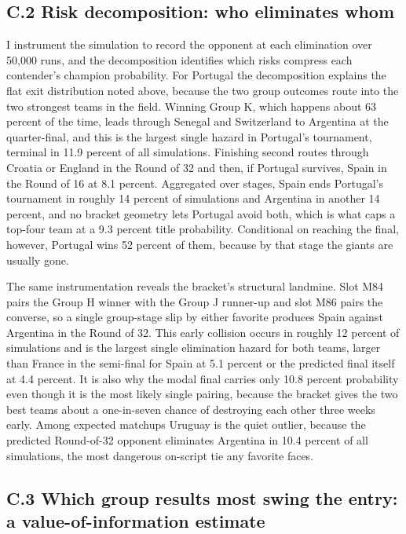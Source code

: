 \documentclass[11pt,letterpaper]{article}
\begin{document}
\subsection*{C.2 \quad Risk decomposition: who eliminates whom}

I instrument the simulation to record the opponent at each elimination over 50{,}000 runs, and the decomposition identifies which risks compress each contender's champion probability. For Portugal the decomposition explains the flat exit distribution noted above, because the two group outcomes route into the two strongest teams in the field. Winning Group K, which happens about 63 percent of the time, leads through Senegal and Switzerland to Argentina at the quarter-final, and this is the largest single hazard in Portugal's tournament, terminal in 11.9 percent of all simulations. Finishing second routes through Croatia or England in the Round of 32 and then, if Portugal survives, Spain in the Round of 16 at 8.1 percent. Aggregated over stages, Spain ends Portugal's tournament in roughly 14 percent of simulations and Argentina in another 14 percent, and no bracket geometry lets Portugal avoid both, which is what caps a top-four team at a 9.3 percent title probability. Conditional on reaching the final, however, Portugal wins 52 percent of them, because by that stage the giants are usually gone.

The same instrumentation reveals the bracket's structural landmine. Slot M84 pairs the Group H winner with the Group J runner-up and slot M86 pairs the converse, so a single group-stage slip by either favorite produces Spain against Argentina in the Round of 32. This early collision occurs in roughly 12 percent of simulations and is the largest single elimination hazard for both teams, larger than France in the semi-final for Spain at 5.1 percent or the predicted final itself at 4.4 percent. It is also why the modal final carries only 10.8 percent probability even though it is the most likely single pairing, because the bracket gives the two best teams about a one-in-seven chance of destroying each other three weeks early. Among expected matchups Uruguay is the quiet outlier, because the predicted Round-of-32 opponent eliminates Argentina in 10.4 percent of all simulations, the most dangerous on-script tie any favorite faces.

\subsection*{C.3 \quad Which group results most swing the entry: a value-of-information estimate}
\end{document}
